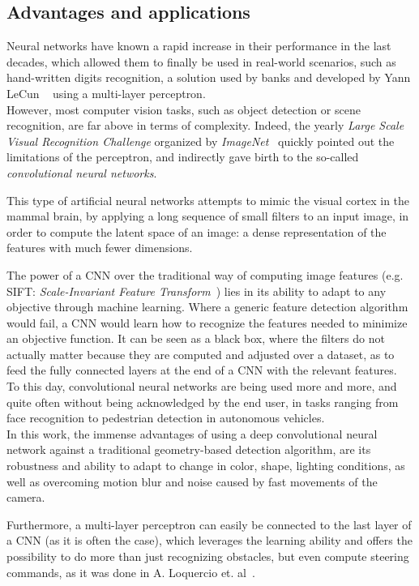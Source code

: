 \subsection{Advantages and applications}

Neural networks have known a rapid increase in their performance in the last
decades, which allowed them to finally be used in real-world scenarios, such as
hand-written digits recognition, a solution used by banks and developed by Yann
LeCun \etal~\cite{41400} using a multi-layer perceptron.\\

However, most computer vision tasks, such as object detection or scene
recognition, are far above in terms of complexity. Indeed, the yearly
\emph{Large Scale Visual Recognition Challenge} organized by
\emph{ImageNet}~\cite{ILSVRC} quickly pointed out the limitations of the
perceptron, and indirectly gave birth to the so-called \emph{convolutional
neural networks}.

This type of artificial neural networks attempts to mimic the visual cortex in
the mammal brain, by applying a long sequence of small filters to an input
image, in order to compute the latent space of an image: a dense representation
of the features with much fewer dimensions.

The power of a CNN over the traditional way of computing image features (e.g.
SIFT: \emph{Scale-Invariant Feature Transform}~\cite{SIFT}) lies in its ability
to adapt to any objective through machine learning. Where a generic feature
detection algorithm would fail, a CNN would learn how to recognize the features
needed to minimize an objective function. It can be seen as a black box, where
the filters do not actually matter because they are computed and adjusted over
a dataset, as to feed the fully connected layers at the end of a CNN with the
relevant features.\\

To this day, convolutional neural networks are being used more and more, and
quite often without being acknowledged by the end user, in tasks ranging from
face recognition to pedestrian detection in autonomous vehicles.\\

In this work, the immense advantages of using a deep convolutional neural network
against a traditional geometry-based detection algorithm, are its robustness and
ability to adapt to change in color, shape, lighting conditions, as well as
overcoming motion blur and noise caused by fast movements of the camera.

Furthermore, a multi-layer perceptron can easily be connected to the last layer
of a CNN (as it is often the case), which leverages the learning ability and
offers the possibility to do more than just recognizing obstacles, but even
compute steering commands, as it was done in A. Loquercio et. al~\cite{dronet}.
